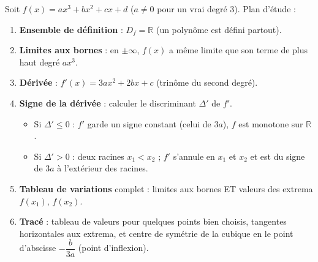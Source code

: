 \documentclass[11pt]{article}
\begin{document}
\begin{methode}
Soit $f(x)=ax^3+bx^2+cx+d$ ($a\neq 0$ pour un vrai degré 3). Plan d'étude :
\begin{enumerate}
\item \textbf{Ensemble de définition} : $D_f=\mathbb{R}$ (un polynôme est défini partout).
\item \textbf{Limites aux bornes} : en $\pm\infty$, $f(x)$ a même limite que son terme de plus haut degré $ax^3$.
\item \textbf{Dérivée} : $f'(x)=3ax^2+2bx+c$ (trinôme du second degré).
\item \textbf{Signe de la dérivée} : calculer le discriminant $\Delta'$ de $f'$.
\begin{itemize}
\item Si $\Delta'\leq 0$ : $f'$ garde un signe constant (celui de $3a$), $f$ est monotone sur $\mathbb{R}$.
\item Si $\Delta'>0$ : deux racines $x_1<x_2$ ; $f'$ s'annule en $x_1$ et $x_2$ et est du signe de $3a$ à l'extérieur des racines.
\end{itemize}
\item \textbf{Tableau de variations} complet : limites aux bornes ET valeurs des extrema $f(x_1)$, $f(x_2)$.
\item \textbf{Tracé} : tableau de valeurs pour quelques points bien choisis, tangentes horizontales aux extrema, et centre de symétrie de la cubique en le point d'abscisse $-\dfrac{b}{3a}$ (point d'inflexion).
\end{enumerate}
\end{methode}
\end{document}
